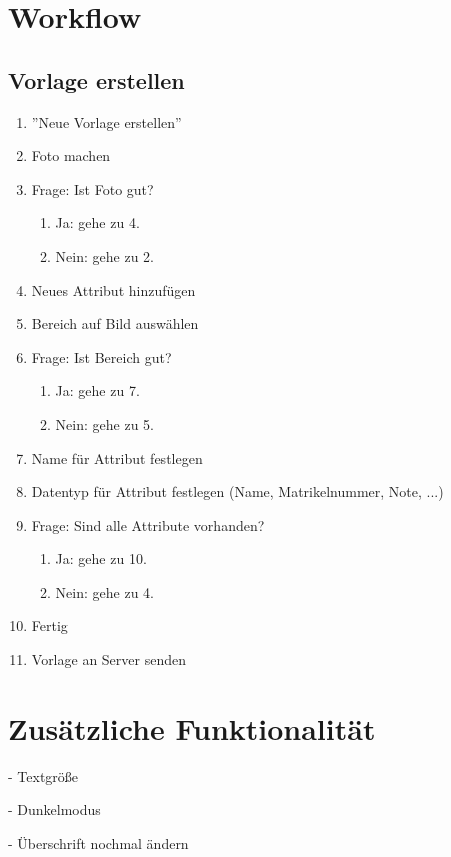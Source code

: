 \documentclass[notables, nomenclature, oneside, 150]{HSMW-Thesis}
\begin{document}
\Anhang

\chapter{Workflow} \label{ch:workflow}
	\section*{Vorlage erstellen}
	\begin{enumerate}
		\item ''Neue Vorlage erstellen''
		\item Foto machen
		\item Frage: Ist Foto gut? 
		\begin{enumerate}
			\item Ja: gehe zu 4.
			\item Nein: gehe zu 2.
		\end{enumerate}
		\item Neues Attribut hinzufügen
		\item Bereich auf Bild auswählen
		\item Frage: Ist Bereich gut?
		\begin{enumerate}
			\item Ja: gehe zu 7.
			\item Nein: gehe zu 5.
		\end{enumerate}
		\item Name für Attribut festlegen
		\item Datentyp für Attribut festlegen (Name, Matrikelnummer, Note, ...)
		\item Frage: Sind alle Attribute vorhanden?
		\begin{enumerate}
			\item Ja: gehe zu 10.
			\item Nein: gehe zu 4.
		\end{enumerate}
		\item Fertig
		\item Vorlage an Server senden
	\end{enumerate}
	
\chapter{Zusätzliche Funktionalität} \label{ch:accses}
	
	- Textgröße
	
	- Dunkelmodus
	
	- Überschrift nochmal ändern
	
\end{document}
